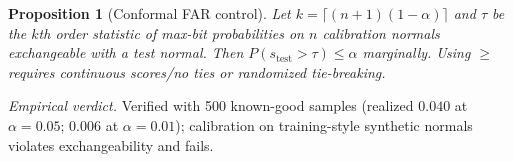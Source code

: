 \documentclass[11pt]{article}
\newtheorem{proposition}{Proposition}
\begin{document}
\begin{proposition}[Conformal FAR control]
Let $k=\lceil(n{+}1)(1{-}\alpha)\rceil$ and $\tau$ be the $k$th order statistic
of max-bit probabilities on $n$ calibration normals exchangeable with a test
normal. Then $P(s_{\mathrm{test}}>\tau)\leq\alpha$ marginally. Using $\geq$
requires continuous scores/no ties or randomized tie-breaking.
\end{proposition}

\emph{Empirical verdict.} Verified with 500 known-good samples (realized
$0.040$ at $\alpha{=}0.05$; $0.006$ at $\alpha{=}0.01$); calibration on
training-style synthetic normals violates exchangeability and fails.



\end{document}
